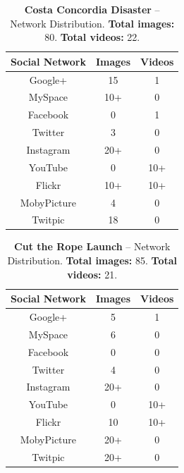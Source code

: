 \documentclass{acm_proc_article-sp}
\begin{document}
\begin{table}[htbp]
  \begin{tabular}{ | c | c | c | }
    \hline
    \textbf{Social Network} & \textbf{Images} & \textbf{Videos}\\
    \hline
    Google+ & 15 & 1\\
    MySpace & 10+ & 0\\
    Facebook & 0 & 1\\
    Twitter & 3 & 0\\
    Instagram & 20+ & 0\\
    YouTube & 0 & 10+\\
    Flickr & 10+ & 10+\\
    MobyPicture & 4 & 0\\
    Twitpic & 18 & 0\\
    \hline
  \end{tabular}
  \label{tab:concordia}
  \caption{\textbf{Costa Concordia Disaster} -- Network Distribution. \textbf{Total images:} 80. \textbf{Total videos:} 22.}
\end{table}

\begin{table}[htbp]
  \begin{tabular}{ | c | c | c | }
    \hline
    \textbf{Social Network} & \textbf{Images} & \textbf{Videos}\\
    \hline
    Google+ & 5 & 1\\
    MySpace & 6 & 0\\
    Facebook & 0 & 0\\
    Twitter & 4 & 0\\
    Instagram & 20+ & 0\\
    YouTube & 0 & 10+\\
    Flickr & 10 & 10+\\ 
    MobyPicture & 20+ & 0\\
    Twitpic & 20+ & 0\\
    \hline
  \end{tabular}
  \label{tab:rope}
  \caption{\textbf{Cut the Rope Launch} -- Network Distribution. \textbf{Total images:} 85. \textbf{Total videos:} 21.}
\end{table}
\end{document}
